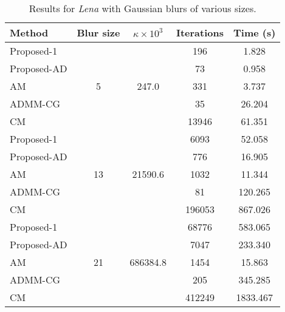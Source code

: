 \documentclass[10pt,twocolumn,twoside]{IEEEtran}
\begin{document}
\begin{table}[h]
	\renewcommand{\arraystretch}{1}
	\caption{Results for \textit{Lena} with Gaussian blurs of various sizes.}
	\centering
\begin{tabular}{l|c|c|c|c}
Method &Blur size &$\kappa \times 10^3$ &Iterations &Time (s) \\
\hline
Proposed-1 & \multirow{5}{*}{5} & \multirow{5}{*}{247.0} &  196 & 1.828  \\
Proposed-AD & & &   73 & 0.958 \\
AM & & &  331 & 3.737 \\
ADMM-CG & & &   35 & 26.204 \\
CM & & & 13946 & 61.351 \\
\hline
Proposed-1 & \multirow{5}{*}{13} & \multirow{5}{*}{21590.6} & 6093 & 52.058  \\
Proposed-AD & & &  776 & 16.905 \\
AM & & & 1032 & 11.344 \\
ADMM-CG & & &   81 & 120.265 \\
CM & & & 196053 & 867.026 \\
\hline
Proposed-1 & \multirow{5}{*}{21} & \multirow{5}{*}{686384.8} & 68776 & 583.065  \\
Proposed-AD & & & 7047 & 233.340 \\
AM & & & 1454 & 15.863 \\
ADMM-CG & & &  205 & 345.285 \\
CM & & & 412249 & 1833.467 \\
\hline
\end{tabular}
\end{table}





\ifCLASSOPTIONcaptionsoff
  \newpage
\fi
\end{document}
